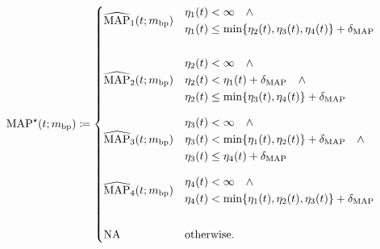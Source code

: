 \documentclass[letterpaper,10pt]{article}
\begin{document}
  \begin{equation}
    \label{eq:map-current-priority}
    \mathrm{MAP}^{\star}(t; m_{\mathrm{bp}}) \coloneqq
  \begin{cases}
    \widehat{\mathrm{MAP}}_{1}(t; m_{\mathrm{bp}}) &
    \begin{aligned}
      &\eta_{1}(t) < \infty \quad \wedge \\
      &\eta_{1}(t) \leq
      \min\{\eta_{2}(t), \eta_{3}(t), \eta_{4}(t)\} + \delta_{\mathrm{MAP}}
    \end{aligned} \\[2.5em]
    \widehat{\mathrm{MAP}}_{2}(t; m_{\mathrm{bp}}) &
    \begin{aligned}
      &\eta_{2}(t) < \infty \quad \wedge \\
      &\eta_{2}(t) < \eta_{1}(t) + \delta_{\mathrm{MAP}} \quad \wedge \\
      &\eta_{2}(t) \leq \min\{\eta_{3}(t), \eta_{4}(t)\} + \delta_{\mathrm{MAP}}
    \end{aligned} \\[2.5em]
    \widehat{\mathrm{MAP}}_{3}(t; m_{\mathrm{bp}}) &
    \begin{aligned}
      &\eta_{3}(t) < \infty \quad \wedge \\
      &\eta_{3}(t) < \min\{\eta_{1}(t), \eta_{2}(t)\} + \delta_{\mathrm{MAP}} \quad \wedge \\
      &\eta_{3}(t) \leq \eta_{4}(t) + \delta_{\mathrm{MAP}}
    \end{aligned} \\[2.5em]
    \widehat{\mathrm{MAP}}_{4}(t; m_{\mathrm{bp}}) &
    \begin{aligned}
      &\eta_{4}(t) < \infty \quad \wedge \\
      &\eta_{4}(t) <
      \min\{\eta_{1}(t), \eta_{2}(t), \eta_{3}(t)\} + \delta_{\mathrm{MAP}}
    \end{aligned} \\[2.5em]
    \mathrm{NA} & \text{otherwise.}
  \end{cases}
\end{equation}
\end{document}

